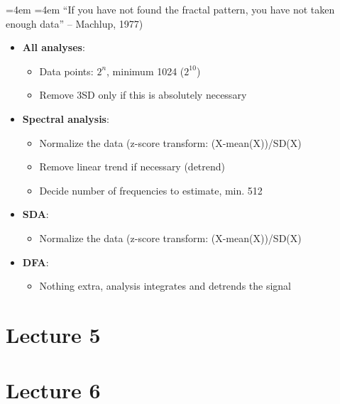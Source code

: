 \documentclass[]{book}
\providecommand{\tightlist}{%
  \setlength{\itemsep}{0pt}\setlength{\parskip}{0pt}}
\renewenvironment{quote}{%
  \par \small \medskip \block
  \leftskip=4em \rightskip=4em%
  \noindent \ignorespaces}{%
  \par \medskip
  }
\begin{document}
\begin{quote}
``If you have not found the fractal pattern, you have not taken enough
data'' -- Machlup, 1977)
\end{quote}

\begin{itemize}
\tightlist
\item
  \textbf{All analyses}:

  \begin{itemize}
  \tightlist
  \item
    Data points: \(2^n\), minimum 1024 (\(2^{10}\))
  \item
    Remove 3SD only if this is absolutely necessary
  \end{itemize}
\item
  \textbf{Spectral analysis}:

  \begin{itemize}
  \tightlist
  \item
    Normalize the data (z-score transform: (X-mean(X))/SD(X)
  \item
    Remove linear trend if necessary (detrend)
  \item
    Decide number of frequencies to estimate, min. 512
  \end{itemize}
\item
  \textbf{SDA}:

  \begin{itemize}
  \tightlist
  \item
    Normalize the data (z-score transform: (X-mean(X))/SD(X)
  \end{itemize}
\item
  \textbf{DFA}:

  \begin{itemize}
  \tightlist
  \item
    Nothing extra, analysis integrates and detrends the signal
  \end{itemize}
\end{itemize}

\chapter*{Lecture 5}\label{lecture-5}

\chapter*{Lecture 6}\label{lecture-6}
\end{document}
